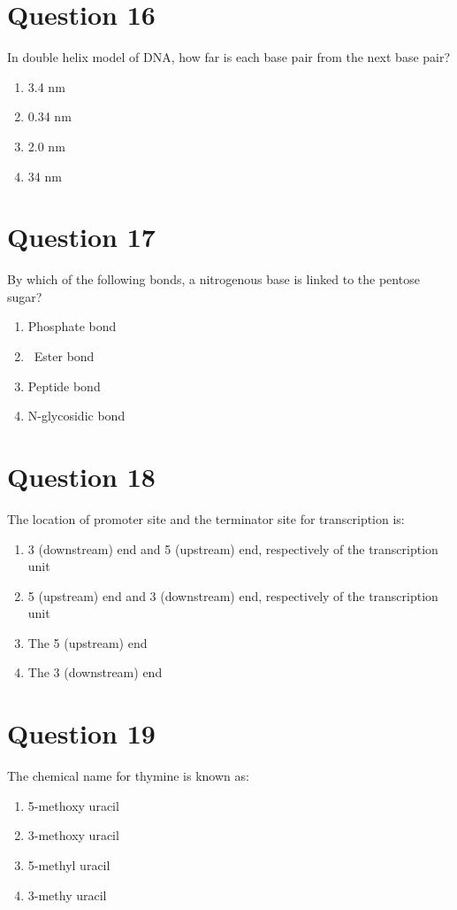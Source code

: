 \documentclass{article}
\begin{document}
\section*{Question 16}
In double helix model of DNA, how far is each base pair from the next base pair?
\begin{enumerate}[label=(\alph*)]
\item 3.4 nm
\item 0.34 nm
\item 2.0 nm
\item 34 nm
\end{enumerate}
\newpage
\section*{Question 17}
By which of the following bonds, a nitrogenous base is linked to the pentose sugar?
\begin{enumerate}[label=(\alph*)]
\item Phosphate bond
\item  Ester bond
\item Peptide bond
\item N-glycosidic bond
\end{enumerate}
\newpage
\section*{Question 18}
The location of promoter site and the terminator site for transcription is:
\begin{enumerate}[label=(\alph*)]
\item 3 (downstream) end and 5 (upstream) end, respectively of the transcription unit
\item 5 (upstream) end and 3 (downstream) end, respectively of the transcription unit
\item The 5 (upstream) end
\item The 3 (downstream) end
\end{enumerate}
\newpage
\section*{Question 19}
The chemical name for thymine is known as:
\begin{enumerate}[label=(\alph*)]
\item 5-methoxy uracil
\item 3-methoxy uracil
\item 5-methyl uracil
\item 3-methy uracil
\end{enumerate}
\newpage
\end{document}

